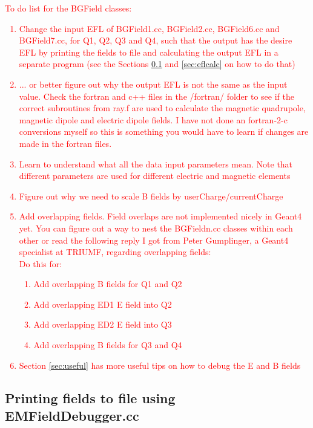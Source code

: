 \documentclass[letter,11pt]{article}
\newcommand{\filefont}[1]{{\scriptsize\ttfamily\selectfont #1}\xspace}
\begin{document}
\textcolor{red}{To do list for the BGField classes:
\begin{enumerate}
\item Change the input EFL of BGField1.cc, BGField2.cc, BGField6.cc and BGField7.cc, for Q1, Q2, Q3 and Q4, such that the output has the desire EFL by printing the fields to file and calculating the output EFL in a separate program (see the Sections \ref{sec:efl} and \ref{sec:eflcalc} on how to do that)
\item ... or better figure out why the output EFL is not the same as the input value. Check the fortran and c++ files in the /fortran/ folder to see if the correct subroutines from \filefont{ray.f} are used to calculate the magnetic quadrupole, magnetic dipole and electric dipole fields. I have not done an fortran-2-c conversions myself so this is something you would have to learn if changes are made in the fortran files.
\item Learn to understand what all the \filefont{data} input parameters mean. Note that different parameters are used for different electric and magnetic elements
\item Figure out why we need to scale B fields by \filefont{userCharge/currentCharge}
\item Add overlapping fields. Field overlaps are not implemented nicely in Geant4 yet. You can figure out a way to nest the BGFieldn.cc classes within each other or read the following reply I got from Peter Gumplinger, a Geant4 specialist at TRIUMF, regarding overlapping fields:\\
{\footnotesize }
Do this for:
\begin{enumerate}[a]
\item Add overlapping B fields for Q1 and Q2
\item Add overlapping ED1 E field into Q2
\item Add overlapping ED2 E field into Q3
\item Add overlapping B fields for Q3 and Q4
\end{enumerate}
\item Section \ref{sec:useful} has more useful tips on how to debug the E and B fields
\end{enumerate}
}

\subsection{Printing fields to file using EMFieldDebugger.cc}\label{sec:efl}
\end{document}
